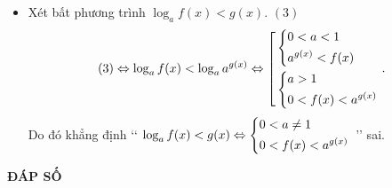 \begin{ex}
{\begin{itemize}
			$$(2)\Leftrightarrow \hoac{& \heva{& 0<a<1\\ & \log _a f(x)\leq \log _a g(x)}\\ & \heva{& a>1\\ & \log _a f(x)\geq \log _a g(x)}}.$$
			Do đó khẳng định {\lq\lq} $a^{\log _a f(x)}\geq a^{\log _a g(x)}\Leftrightarrow \heva{&0<a\neq 1\\ & \log_a f(x)\geq \log_a g(x)}$ {\rq\rq} sai.
			\item Xét bất phương trình $\log _a f(x) < g(x)$. \quad $(3)$
			$$(3)\Leftrightarrow \log _a f(x) < \log _a a^{g(x)}\Leftrightarrow \left[\begin{aligned}& \left\{\begin{aligned}& 0<a<1\\ & a^{g(x)}< f(x)\end{aligned}\right.\\ & \left\{\begin{aligned}& a>1\\ & 0<f(x)< a^{g(x)}\end{aligned}\right.\end{aligned}\right..$$
			Do đó khẳng định {\lq\lq} $\log _a f(x) < g(x)\Leftrightarrow \left\{\begin{aligned}&0<a\neq 1\\ & 0<f(x)< a^{g(x)}\end{aligned}\right.$ {\rq\rq} sai.
		\end{itemize}
	}
\end{ex}
\newpage 
\begin{center}
	\textbf{ĐÁP SỐ}
\end{center}
\begin{multicols}{10}
	\setlength{\columnseprule}{0pt}
	 
\end{multicols}
